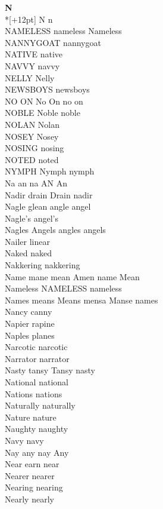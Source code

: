 \vspace{14pt}
\noindent\textbf{\Large N}\\*[+12pt]
N n\\
NAMELESS nameless Nameless\\
NANNYGOAT nannygoat\\
NATIVE native\\
NAVVY navvy\\
NELLY Nelly\\
NEWSBOYS newsboys\\
NO ON No On no on\\
NOBLE Noble noble\\
NOLAN Nolan\\
NOSEY Nosey\\
NOSING nosing\\
NOTED noted\\
NYMPH Nymph nymph\\
Na an na AN An\\
Nadir drain Drain nadir\\
Nagle glean angle angel\\
Nagle's angel's\\
Nagles Angels angles angels\\
Nailer linear\\
Naked naked\\
Nakkering nakkering\\
Name mane mean Amen name Mean\\
Nameless NAMELESS nameless\\
Names means Means mensa Manse names\\
Nancy canny\\
Napier rapine\\
Naples planes\\
Narcotic narcotic\\
Narrator narrator\\
Nasty tansy Tansy nasty\\
National national\\
Nations nations\\
Naturally naturally\\
Nature nature\\
Naughty naughty\\
Navy navy\\
Nay any nay Any\\
Near earn near\\
Nearer nearer\\
Nearing nearing\\
Nearly nearly\\
